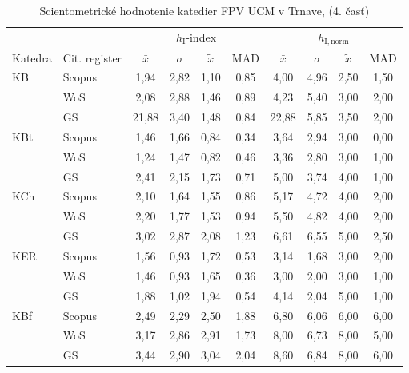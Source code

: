\begin{table}
  \centering\small
  \caption[Hodnotenie FPV\,--\,$h_{\mathrm{I}}$-index a $h_{\mathrm{I,norm}}$]{Scientometrické hodnotenie katedier FPV UCM v Trnave, (4. časť)}
\label{tab:4-staff.results}
\begin{tabularx}{\textwidth}{XXcccc@{\hspace{3ex}}cccc}
  \toprule\noalign{\vspace{.3ex}}
        &             & \multicolumn{4}{c}{$h_{\mathrm{I}}$-index}  & \multicolumn{4}{c}{$h_{\mathrm{I,norm}}$}  \\
Katedra & Cit. register& $\bar{x}$      & $\sigma$  & $\tilde{x}$ & MAD  & $\bar{x}$      & $\sigma$  & $\tilde{x}$  & MAD  \\[0.3ex]
  \midrule\noalign{\vspace{.5ex}}
 KB   & Scopus & 1,94     & 2,82 & 1,10 & 0,85 & 4,00    & 4,96 & 2,50 & 1,50 \\
      & WoS    & 2,08     & 2,88 & 1,46 & 0,89 & 4,23    & 5,40 & 3,00 & 2,00 \\
      & GS     & 21,88    & 3,40 & 1,48 & 0,84 & 22,88   & 5,85 & 3,50 & 2,00 \\[3ex]
 KBt  & Scopus & 1,46     & 1,66 & 0,84 & 0,34 & 3,64    & 2,94 & 3,00 & 0,00 \\
      & WoS    & 1,24     & 1,47 & 0,82 & 0,46 & 3,36    & 2,80 & 3,00 & 1,00 \\
      & GS     & 2,41     & 2,15 & 1,73 & 0,71 & 5,00    & 3,74 & 4,00 & 1,00 \\[3ex]
 KCh  & Scopus & 2,10     & 1,64 & 1,55 & 0,86 & 5,17    & 4,72 & 4,00 & 2,00 \\
      & WoS    & 2,20     & 1,77 & 1,53 & 0,94 & 5,50    & 4,82 & 4,00 & 2,00 \\
      & GS     & 3,02     & 2,87 & 2,08 & 1,23 & 6,61    & 6,55 & 5,00 & 2,50 \\[3ex]
 KER  & Scopus & 1,56     & 0,93 & 1,72 & 0,53 & 3,14    & 1,68 & 3,00 & 2,00 \\
      & WoS    & 1,46     & 0,93 & 1,65 & 0,36 & 3,00    & 2,00 & 3,00 & 1,00 \\
      & GS     & 1,88     & 1,02 & 1,94 & 0,54 & 4,14    & 2,04 & 5,00 & 1,00 \\[3ex]
 KBf  & Scopus & 2,49     & 2,29 & 2,50 & 1,88 & 6,80    & 6,06 & 6,00 & 6,00 \\
      & WoS    & 3,17     & 2,86 & 2,91 & 1,73 & 8,00    & 6,73 & 8,00 & 5,00 \\
      & GS     & 3,44     & 2,90 & 3,04 & 2,04 & 8,60    & 6,84 & 8,00 & 6,00 \\[3ex]

\end{tabularx}
\end{table}
